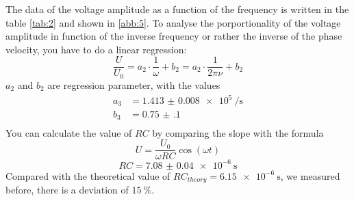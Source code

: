 The data of the voltage amplitude as a function of the frequency is written
in the table \ref{tab:2} and shown in \ref{abb:5}. To analyse the porportionality of the voltage amplitude
in function of the inverse frequency or rather the inverse of the phase velocity,
you have to do a linear regression:
\begin{equation*}
  \frac{U}{U_0} = a_2 \cdot \frac{1}{\omega} + b_2 = a_2 \cdot \frac{1}{2 \pi \nu} + b_2
\end{equation*}
$a_2$ and $b_2$ are regression parameter, with the values
\begin{align*}
  a_3 &= \SI{1.413(8)e5}{\per\second} \\
  b_3 &= \SI{0.75(10)}{} \\
\end{align*}
You can calculate the value of $RC$ by comparing the slope with the formula
\begin{equation}
  \label{eq:1}
  U = \frac{U_0}{\omega R C} \cos{(\omega t)}
\end{equation}
\begin{equation*}
  RC = \SI{7.08(4)e-6}{\second}
\end{equation*}
Compared with the theoretical value of $RC_{theory}= \SI{6.15e-6}{\second}$, we measured before,  there is a
deviation of $\SI{15}{\percent}$.
